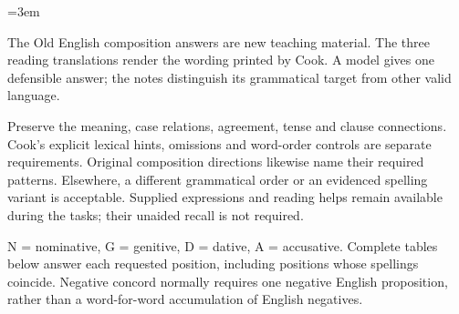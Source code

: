 \newcommand{\runningtitle}{Unit 15. Answer key}

\emergencystretch=3em
\newcommand{\itempara}[2]{\par\addvspace{3pt}\noindent\hangindent=1.8em\hangafter=1\makebox[1.8em][l]{#1.}#2\par}
\newcommand{\reserve}[1]{\par\penalty-100\begingroup\dimen0=\pagegoal\advance\dimen0 by-\pagetotal\ifdim\dimen0<#1\newpage\fi\endgroup}

\raggedright
{}

The Old English composition answers are new teaching material. The three reading translations render the wording printed by Cook. A model gives one defensible answer; the notes distinguish its grammatical target from other valid language.

Preserve the meaning, case relations, agreement, tense and clause connections. Cook’s explicit lexical hints, omissions and word-order controls are separate requirements. Original composition directions likewise name their required patterns. Elsewhere, a different grammatical order or an evidenced spelling variant is acceptable. Supplied expressions and reading helps remain available during the tasks; their unaided recall is not required.

N = nominative, G = genitive, D = dative, A = accusative. Complete tables below answer each requested position, including positions whose spellings coincide. Negative concord normally requires one negative English proposition, rather than a word-for-word accumulation of English negatives.

